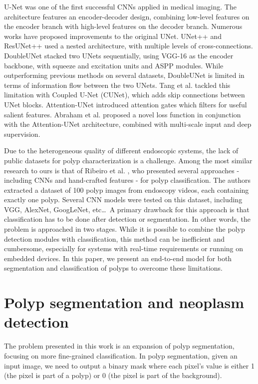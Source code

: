\documentclass[runningheads]{llncs}
\begin{document}
	U-Net \cite{ronneberger2015u} was one of the first successful CNNs applied in medical imaging. The architecture features an encoder-decoder design, combining low-level features on the encoder branch with high-level features on the decoder branch. Numerous works have proposed improvements to the original UNet. UNet++ \cite{zhou2019unet++} and ResUNet++ \cite{jha2019resunet++} used a nested architecture, with multiple levels of cross-connections. DoubleUNet \cite{jha2020doubleu} stacked two UNets sequentially, using VGG-16 as the encoder backbone, with squeeze and excitation units and ASPP modules. While outperforming previous methods on several datasets, DoubleUNet is limited in terms of information flow between the two UNets. Tang et al. \cite{tang2019cu} tackled this limitation with Coupled U-Net (CUNet), which adds skip connections between UNet blocks. Attention-UNet \cite{oktay2018attention} introduced attention gates which filters for useful salient features. Abraham et al. \cite{abraham2019novel} proposed a novel loss function in conjunction with the Attention-UNet architecture, combined with multi-scale input and deep supervision.



	Due to the heterogeneous quality of different endoscopic systems, the lack of public datasets for polyp characterization is a challenge. Among the most similar research to ours is that of Ribeiro et al. \cite{ribeiro2016exploring}, who presented several approaches - including CNNs and hand-crafted features - for polyp classification. The authors extracted a dataset of 100 polyp images from endoscopy videos, each containing exactly one polyp. Several CNN models were tested on this dataset, including VGG, AlexNet, GoogLeNet, etc\dots\ A primary drawback for this approach is that classification has to be done after detection or segmentation. In other words, the problem is approached in two stages. While it is possible to combine the polyp detection modules with classification, this method can be inefficient and cumbersome, especially for systems with real-time requirements or running on embedded devices. In this paper, we present an end-to-end model for both segmentation and classification of polyps to overcome these limitations.


	\section{Polyp segmentation and neoplasm detection}
	\label{sec:problem}
	The problem presented in this work is an expansion of polyp segmentation, focusing on more fine-grained classification. In polyp segmentation, given an input image, we need to output a binary mask where each pixel's value is either 1 (the pixel is part of a polyp) or 0 (the pixel is part of the background).
\end{document}

